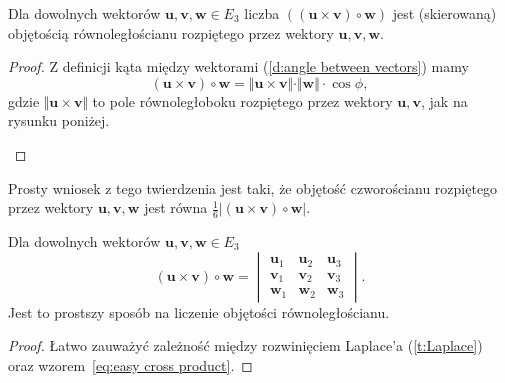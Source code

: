 \begin{theorem}
    \label{t:volume of parallelepiped}
    Dla dowolnych wektorów $\symbf{u}, \symbf{v}, \symbf{w} \in E_3$ liczba $\left((\symbf{u}\times\symbf{v}) \circ \symbf{w}\right)$ jest (skierowaną) objętością równoległościanu rozpiętego przez wektory $\symbf{u}, \symbf{v}, \symbf{w}$.
\end{theorem}
\begin{proof}
    Z definicji kąta między wektorami (\ref{d:angle between vectors}) mamy
    \[ (\symbf{u}\times\symbf{v}) \circ \symbf{w} = \Vert\symbf{u}\times\symbf{v}\Vert \cdot \Vert\symbf{w}\Vert \cdot \cos\phi, \]
    gdzie $\Vert\symbf{u}\times\symbf{v}\Vert$ to pole równoległoboku rozpiętego przez wektory $\symbf{u}, \symbf{v}$, jak na rysunku poniżej.

    \begin{center}
    \end{center}
\end{proof}

Prosty wniosek z tego twierdzenia jest taki, że objętość czworościanu rozpiętego przez wektory $\symbf{u}, \symbf{v}, \symbf{w}$ jest równa $\frac{1}{6}|(\symbf{u}\times\symbf{v}) \circ \symbf{w}|$.

\begin{fact}
    \label{f:triple product}
    Dla dowolnych wektorów $\symbf{u}, \symbf{v}, \symbf{w} \in E_3$
    \[ (\symbf{u}\times\symbf{v}) \circ \symbf{w} = \begin{vmatrix}
        \symbf{u}_1 & \symbf{u}_2 & \symbf{u}_3 \\
        \symbf{v}_1 & \symbf{v}_2 & \symbf{v}_3 \\
        \symbf{w}_1 & \symbf{w}_2 & \symbf{w}_3
    \end{vmatrix}. \]
    Jest to prostszy sposób na liczenie objętości równoległościanu.
\end{fact}
\begin{proof}
    Łatwo zauważyć zależność między rozwinięciem Laplace'a (\ref{t:Laplace}) oraz wzorem~\ref{eq:easy cross product}.
\end{proof}

